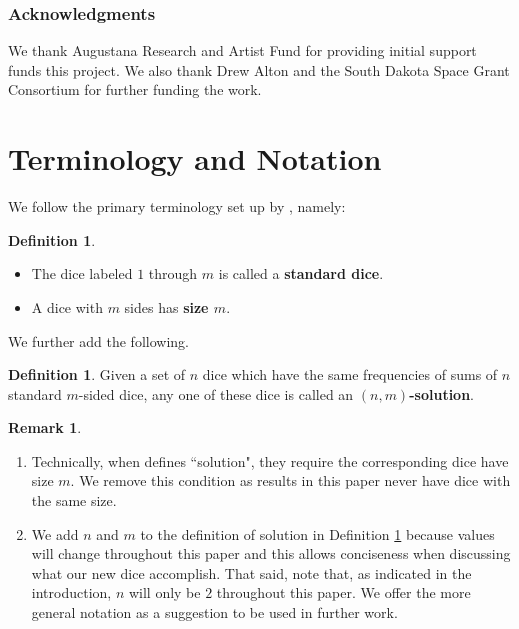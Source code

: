 \documentclass[11pt]{amsart}
\numberwithin{equation}{section}
\theoremstyle{plain}
\theoremstyle{definition}
\newtheorem{definition}[equation]{Definition}
\newtheorem{remark}[equation]{Remark}
\begin{document}
\subsubsection*{Acknowledgments}

We thank Augustana Research and Artist Fund for providing initial support funds this project. We also thank Drew Alton and the South Dakota Space Grant Consortium for further funding the work. 

\section{Terminology and Notation}\label{sec:term}

We follow the primary terminology set up by \cite{gc}, namely: 
\begin{definition}\leavevmode
\begin{itemize}
\item The dice labeled $1$ through $m$ is called a \textbf{standard dice}. 
\item A dice with $m$ sides has \textbf{size $m$}.
\end{itemize}
\end{definition}

\noindent We further add the following. 

\begin{definition}\label{def:nms}
Given a set of $n$ dice which have the same frequencies of sums of $n$ standard $m$-sided dice, any one of these dice is called an \textbf{$(n,m)$-solution}. 
\end{definition}


\begin{remark}\leavevmode
\begin{enumerate}
\item 
Technically, when \cite{gc} defines ``solution", they require the corresponding dice have size $m$. We remove this condition as results in this paper never have dice with the same size. 
\item We add $n$ and $m$ to the definition of solution in Definition \ref{def:nms} because values will change throughout this paper and this allows conciseness when discussing what our new dice accomplish. That said, note that, as indicated in the introduction, $n$ will only be $2$ throughout this paper. We offer the more general notation as a suggestion to be used in further work.
\end{enumerate}
\end{remark}
\end{document}

